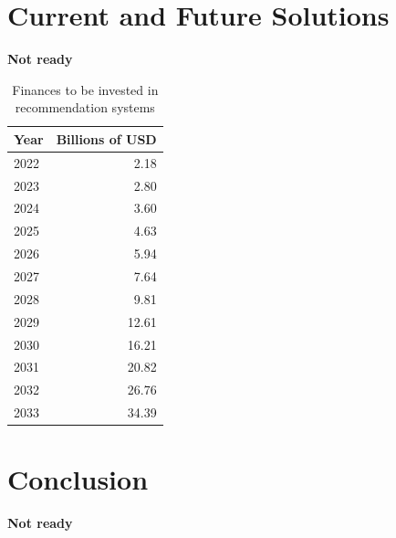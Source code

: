 \documentclass[10pt,twoside,slovak,a4paper]{article}
\begin{document}
\section{Current and Future Solutions} \label{Current and Future Solutions}
\textbf{Not ready}
\begin{table}[ht]
\centering
    \begin{tabular}{l|r}
        Year  & Billions of USD \\\hline
        2022  & 2.18   \\
        2023  & 2.80   \\
        2024  & 3.60   \\
        2025  & 4.63   \\
        2026  & 5.94   \\
        2027  & 7.64   \\
        2028  & 9.81   \\
        2029  & 12.61  \\
        2030  & 16.21  \\
        2031  & 20.82  \\
        2032  & 26.76  \\
        2033  & 34.39  \\
    \end{tabular}
    \caption{Finances to be invested in recommendation systems}
    \label{tab:widgets}
\end{table}
\section{Conclusion} \label{Conclusion}
\textbf{Not ready}





\end{document}
